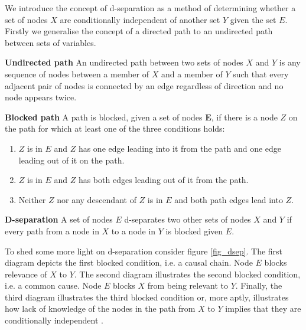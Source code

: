 We introduce the concept of d-separation as a method of determining whether a set of nodes $X$ are conditionally independent of another set $Y$ given the set $E$. Firstly we generalise the concept of a directed path to an undirected path between sets of variables.
\begin{defn}
\textbf{Undirected path} An undirected path between two sets of nodes $X$ and $Y$ is any sequence of nodes between a member of $X$ and a member of $Y$ such that every adjacent pair of nodes is connected by an edge regardless of direction and no node appears twice.
\end{defn}
\begin{defn}
\textbf{Blocked path} A path is blocked, given a set of nodes $\mathbf{E}$, if there is a node $Z$ on the path for which at least one of the three conditions holds:
\begin{enumerate}
\item
$Z$ is in $E$ and $Z$ has one edge leading into it from the path and one edge leading out of it on the path.
\item
$Z$ is in $E$ and $Z$ has both edges leading out of it from the path.
\item
Neither $Z$ nor any descendant of $Z$ is in $E$ and both path edges lead into $Z$.
\end{enumerate}
\end{defn}
\begin{defn}
\textbf{D-separation} A set of nodes $E$ d-separates two other sets of nodes $X$ and $Y$ if every path from a node in $X$ to a node in $Y$ is blocked given $E$.
\end{defn}
To shed some more light on d-separation consider figure \ref{fig_dsep}. The first diagram depicts the first blocked condition, i.e. a causal chain. Node $E$ blocks relevance of $X$ to $Y$. The second diagram illustrates the second blocked condition, i.e. a common cause. Node $E$ blocks $X$ from being relevant to $Y$. Finally, the third diagram illustrates the third blocked condition or, more aptly, illustrates how lack of knowledge of the nodes in the path from $X$ to $Y$ implies that they are conditionally independent \cite{korb}.
